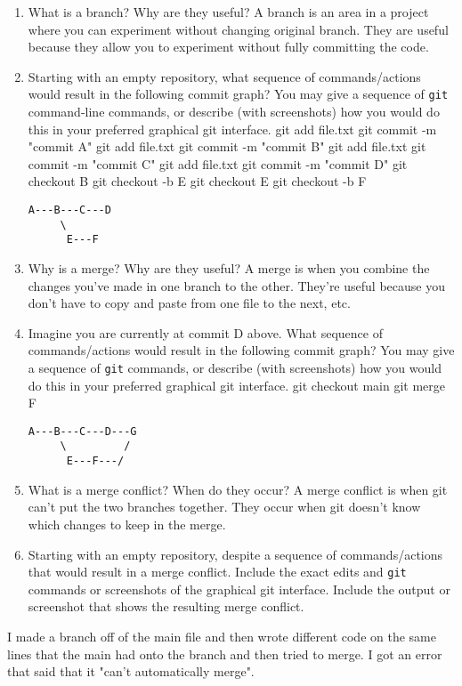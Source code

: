 \documentclass[10pt,twocolumn]{article}
\begin{document}
\begin{enumerate}
\item What is a branch? Why are they useful?
A branch is an area in a project where you can experiment without changing original branch. They are useful because they allow you to experiment without fully committing the code.
\item  Starting with an empty repository, what sequence of commands/actions would result in the following commit graph? You may give a sequence of \texttt{git} command-line commands, or describe (with screenshots) how you would do this in your preferred graphical git interface.
git add file.txt git commit -m "commit A"
git add file.txt git commit -m "commit B"
git add file.txt git commit -m "commit C"
git add file.txt git commit -m "commit D"
git checkout B git checkout -b E
git checkout E git checkout -b F
\begin{verbatim}
A---B---C---D
     \
      E---F
\end{verbatim}
\item Why is a merge? Why are they useful?
A merge is when you combine the changes you've made in one branch to the other. They're useful because you don't have to copy and paste from one file to the next, etc.
\item Imagine you are currently at commit D above. What sequence of commands/actions would result in the following commit graph? You may give a sequence of \texttt{git} commands, or describe (with screenshots) how you would do this in your preferred graphical git interface.
git checkout main
git merge F
\begin{verbatim}
A---B---C---D---G
     \         /
      E---F---/
\end{verbatim}
\item What is a merge conflict? When do they occur?
A merge conflict is when git can't put the two branches together. They occur when git doesn't know which changes to keep in the merge.
\item Starting with an empty repository, despite a sequence of commands/actions that would result in a merge conflict. Include the exact edits and \texttt{git} commands or screenshots of the graphical git interface. Include the output or screenshot that shows the resulting merge conflict.
\end{enumerate}

I made a branch off of the main file and then wrote different code on the same lines that the main had onto the branch and then tried to merge. I got an error that said that it "can't automatically merge".
\end{document}
